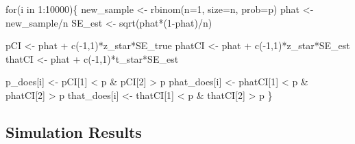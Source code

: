 \documentclass[
  letterpaper,
  DIV=11,
  numbers=noendperiod]{scrreprt}
\newenvironment{Shaded}{\begin{snugshade}}{\end{snugshade}}
\newcommand{\AttributeTok}[1]{\textcolor[rgb]{0.40,0.45,0.13}{#1}}
\newcommand{\ControlFlowTok}[1]{\textcolor[rgb]{0.00,0.23,0.31}{#1}}
\newcommand{\DecValTok}[1]{\textcolor[rgb]{0.68,0.00,0.00}{#1}}
\newcommand{\FunctionTok}[1]{\textcolor[rgb]{0.28,0.35,0.67}{#1}}
\newcommand{\NormalTok}[1]{\textcolor[rgb]{0.00,0.23,0.31}{#1}}
\newcommand{\OtherTok}[1]{\textcolor[rgb]{0.00,0.23,0.31}{#1}}
\newcommand{\SpecialCharTok}[1]{\textcolor[rgb]{0.37,0.37,0.37}{#1}}
\begin{document}
\begin{Shaded}
\begin{Highlighting}[]
\ControlFlowTok{for}\NormalTok{(i }\ControlFlowTok{in} \DecValTok{1}\SpecialCharTok{:}\DecValTok{10000}\NormalTok{)\{}
\NormalTok{    new\_sample }\OtherTok{\textless{}{-}} \FunctionTok{rbinom}\NormalTok{(}\AttributeTok{n=}\DecValTok{1}\NormalTok{, }\AttributeTok{size=}\NormalTok{n, }\AttributeTok{prob=}\NormalTok{p)}
\NormalTok{    phat }\OtherTok{\textless{}{-}}\NormalTok{ new\_sample}\SpecialCharTok{/}\NormalTok{n}
\NormalTok{    SE\_est }\OtherTok{\textless{}{-}} \FunctionTok{sqrt}\NormalTok{(phat}\SpecialCharTok{*}\NormalTok{(}\DecValTok{1}\SpecialCharTok{{-}}\NormalTok{phat)}\SpecialCharTok{/}\NormalTok{n)}
    
\NormalTok{    pCI }\OtherTok{\textless{}{-}}\NormalTok{ phat }\SpecialCharTok{+} \FunctionTok{c}\NormalTok{(}\SpecialCharTok{{-}}\DecValTok{1}\NormalTok{,}\DecValTok{1}\NormalTok{)}\SpecialCharTok{*}\NormalTok{z\_star}\SpecialCharTok{*}\NormalTok{SE\_true}
\NormalTok{    phatCI }\OtherTok{\textless{}{-}}\NormalTok{ phat }\SpecialCharTok{+} \FunctionTok{c}\NormalTok{(}\SpecialCharTok{{-}}\DecValTok{1}\NormalTok{,}\DecValTok{1}\NormalTok{)}\SpecialCharTok{*}\NormalTok{z\_star}\SpecialCharTok{*}\NormalTok{SE\_est}
\NormalTok{    thatCI }\OtherTok{\textless{}{-}}\NormalTok{ phat }\SpecialCharTok{+} \FunctionTok{c}\NormalTok{(}\SpecialCharTok{{-}}\DecValTok{1}\NormalTok{,}\DecValTok{1}\NormalTok{)}\SpecialCharTok{*}\NormalTok{t\_star}\SpecialCharTok{*}\NormalTok{SE\_est}
    
\NormalTok{    p\_does[i] }\OtherTok{\textless{}{-}}\NormalTok{ pCI[}\DecValTok{1}\NormalTok{] }\SpecialCharTok{\textless{}}\NormalTok{ p }\SpecialCharTok{\&}\NormalTok{ pCI[}\DecValTok{2}\NormalTok{] }\SpecialCharTok{\textgreater{}}\NormalTok{ p}
\NormalTok{    phat\_does[i] }\OtherTok{\textless{}{-}}\NormalTok{ phatCI[}\DecValTok{1}\NormalTok{] }\SpecialCharTok{\textless{}}\NormalTok{ p }\SpecialCharTok{\&}\NormalTok{ phatCI[}\DecValTok{2}\NormalTok{] }\SpecialCharTok{\textgreater{}}\NormalTok{ p}
\NormalTok{    that\_does[i] }\OtherTok{\textless{}{-}}\NormalTok{ thatCI[}\DecValTok{1}\NormalTok{] }\SpecialCharTok{\textless{}}\NormalTok{ p }\SpecialCharTok{\&}\NormalTok{ thatCI[}\DecValTok{2}\NormalTok{] }\SpecialCharTok{\textgreater{}}\NormalTok{ p}
\NormalTok{\}}
\end{Highlighting}
\end{Shaded}

\hypertarget{simulation-results}{%
\subsection{Simulation Results}\label{simulation-results}}
\end{document}
